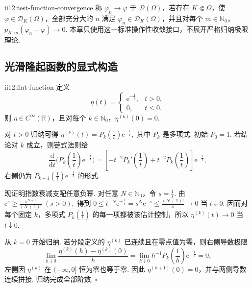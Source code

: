 \begin{FADefinition}[B][测试函数的操作性收敛]{ii12:test-function-convergence}
称 \(\displaystyle\varphi_n\to\varphi\) 于 \(\displaystyle\mathcal D(\Omega)\)，若存在 \(\displaystyle K\Subset\Omega\)，使 \(\displaystyle\varphi\in\mathcal D_K(\Omega)\)，全部充分大的 \(\displaystyle n\) 满足 \(\displaystyle\varphi_n\in\mathcal D_K(\Omega)\)，并且对每个 \(\displaystyle m\in\mathbb N_0\)， \(\displaystyle p_{K,m}(\varphi_n-\varphi)\longrightarrow0.\)
本章只使用这一标准操作性收敛接口，不展开严格归纳极限理论.
\end{FADefinition}

\subsection{光滑隆起函数的显式构造}

\begin{FALemma}[B][一维平坦函数]{ii12:flat-function}
定义
\[
\eta(t)
=
\begin{cases}
\mathrm{e}^{-\frac{1}{t}},&t>0,\\
0,&t\leqslant0.
\end{cases}
\]
则 \(\displaystyle\eta\in C^\infty(\mathbb R)\)，且对每个 \(\displaystyle k\in\mathbb N_0\)，\(\displaystyle\eta^{(k)}(0)=0\).
\end{FALemma}

\begin{FAProof}
对 \(\displaystyle t>0\) 归纳可得 \(\displaystyle \eta^{(k)}(t)=P_k(\frac{1}{t})\mathrm{e}^{-\frac{1}{t}},\)
其中 \(\displaystyle P_k\) 是多项式. 初始 \(\displaystyle P_0=1\). 若结论对 \(\displaystyle k\) 成立，则链式法则给
\[
\frac{\mathrm{d}}{\mathrm{d}t}
\bigl(P_k(\frac{1}{t})\mathrm{e}^{-\frac{1}{t}}\bigr)
=
\left[-t^{-2}P_k'(\frac{1}{t})+t^{-2}P_k(\frac{1}{t})\right]\mathrm{e}^{-\frac{1}{t}},
\]
右侧仍为 \(\displaystyle P_{k+1}(\frac{1}{t})\mathrm{e}^{-\frac{1}{t}}\) 的形式.

现证明指数衰减支配任意负幂. 对任意 \(\displaystyle N\in\mathbb N_0\)，令 \(\displaystyle s=\frac{1}{t}\). 由 \(\displaystyle \mathrm{e}^s \geqslant \frac{s^{N+1}}{(N+1)!} \;(s>0),\)
得到 \(\displaystyle 0\leqslant t^{-N}\mathrm{e}^{-\frac{1}{t}} =s^N\mathrm{e}^{-s} \leqslant \frac{(N+1)!}{s} \longrightarrow0\)
当 \(\displaystyle t\downarrow0\). 因而对每个固定 \(\displaystyle k\)，多项式 \(\displaystyle P_k(\frac{1}{t})\) 的每一项都被该估计控制，所以 \(\displaystyle\eta^{(k)}(t)\to0\) 当 \(\displaystyle t\downarrow0\).

从 \(\displaystyle k=0\) 开始归纳. 若分段定义的 \(\displaystyle\eta^{(k)}\) 已连续且在零点值为零，则右侧导数极限
\[
\lim_{h\downarrow0}
\frac{\eta^{(k)}(h)-\eta^{(k)}(0)}{h}
=
\lim_{h\downarrow0}h^{-1}P_k(\frac{1}{h})\mathrm{e}^{-\frac{1}{h}}
=0,
\]
左侧因 \(\displaystyle\eta^{(k)}\) 在 \(\displaystyle(-\infty,0]\) 恒为零也等于零. 因此 \(\displaystyle\eta^{(k+1)}(0)=0\)，并与两侧导数连续拼接. 归纳完成全部阶数.
\hfill\(\square\)
\end{FAProof}


